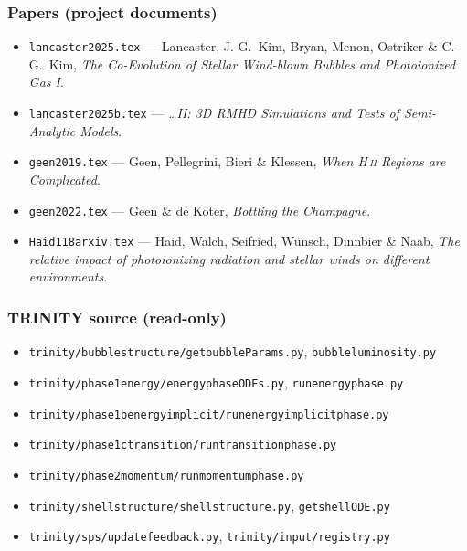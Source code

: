 \documentclass[11pt,a4paper,oneside]{report}
\newcommand{\brkus}{\textunderscore\allowbreak}
\newcommand{\code}[1]{\texttt{\small\let\_\brkus #1}}
\begin{document}
\subsubsection*{Papers (project documents)}
\begin{itemize}\small\raggedright
\item \code{lancaster2025.tex} --- Lancaster, J.-G.\ Kim, Bryan, Menon, Ostriker \& C.-G.\ Kim,
      \emph{The Co-Evolution of Stellar Wind-blown Bubbles and Photoionized Gas I}.
\item \code{lancaster2025b.tex} --- \emph{\dots II: 3D RMHD Simulations and Tests of
      Semi-Analytic Models}.
\item \code{geen2019.tex} --- Geen, Pellegrini, Bieri \& Klessen, \emph{When H\,\textsc{ii}
      Regions are Complicated}.
\item \code{geen2022.tex} --- Geen \& de Koter, \emph{Bottling the Champagne}.
\item \code{Haid118\_arxiv.tex} --- Haid, Walch, Seifried, W\"unsch, Dinnbier \& Naab,
      \emph{The relative impact of photoionizing radiation and stellar winds on different
      environments}.
\end{itemize}

\subsubsection*{TRINITY source (read-only)}
\begin{itemize}\small\raggedright
\item \code{trinity/bubble\_structure/get\_bubbleParams.py}, \code{bubble\_luminosity.py}
\item \code{trinity/phase1\_energy/energy\_phase\_ODEs.py}, \code{run\_energy\_phase.py}
\item \code{trinity/phase1b\_energy\_implicit/run\_energy\_implicit\_phase.py}
\item \code{trinity/phase1c\_transition/run\_transition\_phase.py}
\item \code{trinity/phase2\_momentum/run\_momentum\_phase.py}
\item \code{trinity/shell\_structure/shell\_structure.py}, \code{get\_shellODE.py}
\item \code{trinity/sps/update\_feedback.py}, \code{trinity/\_input/registry.py}
\end{itemize}
\end{document}
